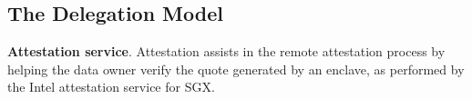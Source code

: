  








\subsection{The Delegation Model}


\vspace{3pt}\noindent\textbf{Attestation service}. Attestation \DIFdelbegin {}\DIFdelend \DIFaddbegin {}\DIFaddend assists in the remote attestation process by helping the data owner verify the quote generated by an enclave, as performed by the Intel attestation service for SGX. 

